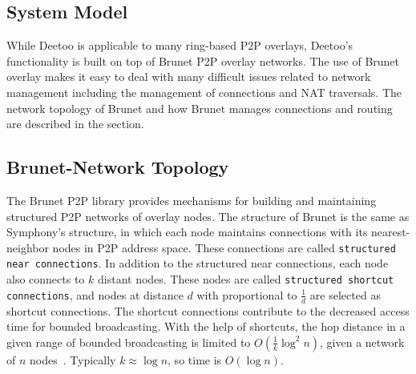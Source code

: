 \documentclass[9.5pt,journal,final,finalsubmission,twocolumn]{IEEEtran}
\begin{document}
\subsection{System Model}
While Deetoo is applicable to many ring-based P2P overlays, Deetoo's  
functionality is built on top of Brunet P2P overlay networks. 
The use of Brunet overlay makes it easy to deal with many 
difficult issues related to network management including the management
of connections and NAT traversals. 
The network topology of Brunet and how
Brunet manages connections and routing are described in the section.

\subsection{Brunet-Network Topology}
The Brunet P2P library provides mechanisms for building and maintaining structured P2P 
networks of overlay nodes. The structure of Brunet is the same as Symphony's structure, 
in which each node maintains connections with its nearest-neighbor nodes in P2P address 
space. These connections are called \texttt{structured near connections}. 
In addition to the structured near connections, each node also connects to 
$k$ distant nodes. 
These nodes are called \texttt{structured shortcut connections},
and nodes at distance $d$
with proportional to $\frac{1}{d}$ are selected as shortcut connections.
The shortcut connections contribute to the decreased access time for 
bounded broadcasting.
With the help of shortcuts, the hop distance in a given range of bounded broadcasting 
is limited to $O(\frac{1}{k}\log^2{n})$, given a network of $n$ 
nodes~\cite{jk:Information}. Typically $k\approx\log{n}$, so time is $O(\log{n})$.
\end{document}
